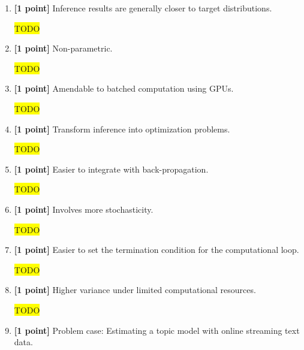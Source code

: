 \documentclass[10pt]{article}
\newcommand{\hilight}[1]{\colorbox{yellow}{#1}}
\begin{document}
\begin{enumerate}
    \item \textbf{[1 point]} Inference results are generally closer to target distributions.
\begin{solution}
\hilight{TODO}
\end{solution}
    \item \textbf{[1 point]} Non-parametric.
\begin{solution}
\hilight{TODO}
\end{solution}
    \item \textbf{[1 point]} Amendable to batched computation using GPUs.
\begin{solution}
\hilight{TODO}
\end{solution}
    \item \textbf{[1 point]} Transform inference into optimization problems.
\begin{solution}
\hilight{TODO}
\end{solution}
    \item \textbf{[1 point]} Easier to integrate with back-propagation.
\begin{solution}
\hilight{TODO}
\end{solution}
    \item \textbf{[1 point]} Involves more stochasticity.
\begin{solution}
\hilight{TODO}
\end{solution}
    \item \textbf{[1 point]} Easier to set the termination condition for the computational loop.
\begin{solution}
\hilight{TODO}
\end{solution}
    \item \textbf{[1 point]} Higher variance under limited computational resources.
\begin{solution}
\hilight{TODO}
\end{solution}
    \item \textbf{[1 point]} Problem case: Estimating a topic model with online streaming text data.

\end{enumerate}
\end{document}
